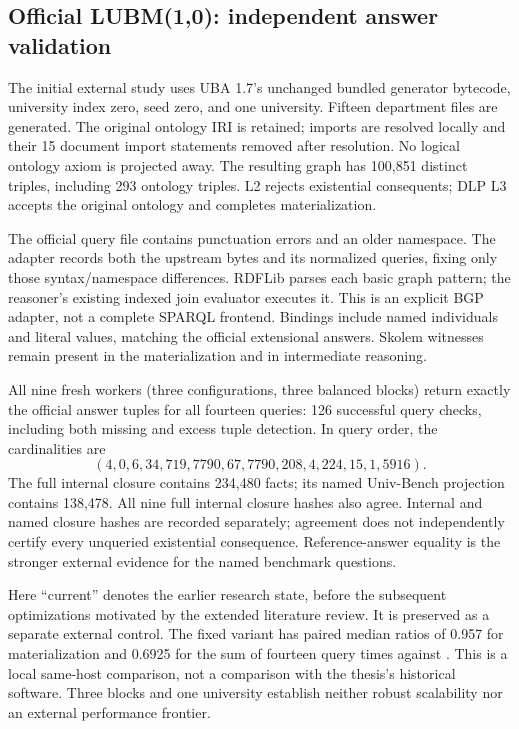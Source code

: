 \subsection{Official LUBM(1,0): independent answer validation}
The initial external study uses UBA 1.7's unchanged bundled generator bytecode,
university index zero, seed zero, and one university. Fifteen department files
are generated. The original ontology IRI is retained; imports are resolved
locally and their 15 document import statements removed after resolution.
No logical ontology axiom is projected away. The resulting graph has 100,851
distinct triples, including 293 ontology triples. L2 rejects existential
consequents; DLP L3 accepts the original ontology and completes materialization.

The official query file contains punctuation errors and an older namespace.
The adapter records both the upstream bytes and its normalized queries, fixing
only those syntax/namespace differences. RDFLib parses each basic graph
pattern; the reasoner's existing indexed join evaluator executes it. This is
an explicit BGP adapter, not a complete SPARQL frontend. Bindings include named
individuals and literal values, matching the official extensional answers.
Skolem witnesses remain present in the materialization and in intermediate
reasoning.

All nine fresh workers (three configurations, three balanced blocks) return
exactly the official answer tuples for all fourteen queries: 126 successful
query checks, including both missing and excess tuple detection. In query
order, the cardinalities are
\begin{equation*}
(4,0,6,34,719,7790,67,7790,208,4,224,15,1,5916).
\end{equation*}
The full internal closure contains 234,480 facts; its named Univ-Bench projection
contains 138,478. All nine full internal closure hashes also agree. Internal
and named closure hashes are recorded separately; agreement does not independently certify every
unqueried existential consequence. Reference-answer equality is the stronger
external evidence for the named benchmark questions.


Here ``current'' denotes the earlier  research state, before the
subsequent optimizations motivated by the extended literature review. It is
preserved as a separate external control. The fixed variant has paired median
ratios of 0.957 for materialization and 0.6925 for the sum of fourteen query
times against . This is a local same-host comparison, not a
comparison with the thesis's historical software. Three blocks and one
university establish neither robust scalability nor an external performance
frontier.

